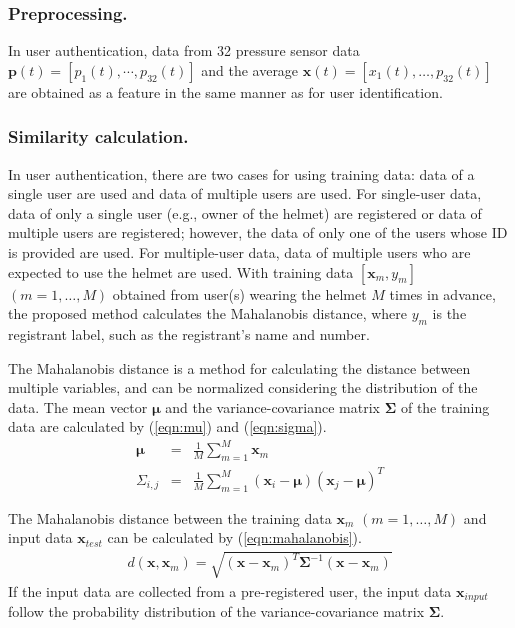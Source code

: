 \documentclass[sigconf,authordraft]{acmart}
\begin{document}
\subsubsection{Preprocessing.}
In user authentication, data from 32 pressure sensor data $\bm{p}(t)=[p_1(t),\cdots,p_{32}(t)]$ and the average $\bm{x}(t)=[x_{1}(t),\dots,p_{32}(t)]$ are obtained as a feature in the same manner as for user identification.


\subsubsection{Similarity calculation.}
In user authentication, there are two cases for using training data: data of a single user are used and data of multiple users are used. For single-user data, data of only a single user (e.g., owner of the helmet) are registered or data of multiple users are registered; however, the data of only one of the users whose ID is provided are used. For multiple-user data, data of multiple users who are expected to use the helmet are used. With training data $[\bm{x}_m,y_m]$ $(m=1,\dots, M)$ obtained from user(s) wearing the helmet $M$ times in advance, the proposed method calculates the Mahalanobis distance, where $y_m$ is the registrant label, such as the registrant's name and number.\par

The Mahalanobis distance is a method for calculating the distance between multiple variables, and can be normalized considering the distribution of the data. The mean vector $\bm{\mu}$ and the variance-covariance matrix $\bm{\Sigma}$ of the training data are calculated by (\ref{eqn:mu}) and (\ref{eqn:sigma}).
\begin{eqnarray}
\label{eqn:mu}
  \bm{\mu} &=& \frac{1}{M}\sum_{m=1}^{M}\bm{x}_m \\
\label{eqn:sigma}
  \Sigma_{i,j} &=& \frac{1}{M}\sum_{m=1}^{M}(\bm{x}_i-\bm{\mu})(\bm{x}_j-\bm{\mu})^T
\end{eqnarray}
 
The Mahalanobis distance between the training data $\bm{x}_m$ $(m=1,\dots, M)$ and input data $\bm{x}_{test}$ can be calculated by (\ref{eqn:mahalanobis}).
\begin{eqnarray}
\label{eqn:mahalanobis}
  d(\bm{x},\bm{x}_m) = \sqrt{(\bm{x}-\bm{x}_m)^{T}\bm{\Sigma}^{-1}(\bm{x}-\bm{x}_m)}
\end{eqnarray}
If the input data are collected from a pre-registered user, the input data $\bm{x}_{input}$ follow the probability distribution of the variance-covariance matrix $\bm{\Sigma}$.
\end{document}
